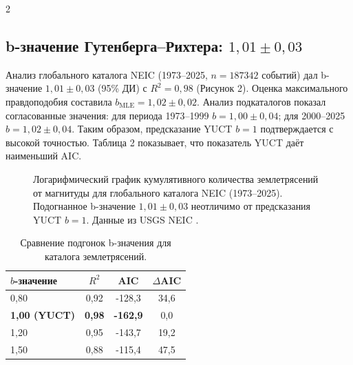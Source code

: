 \documentclass[11pt,a4paper]{article}
\begin{document}
\begin{multicols}{2}
		\subsection{b-значение Гутенберга–Рихтера: \(1,01 \pm 0,03\)}
		
		Анализ глобального каталога NEIC (1973–2025, \(n = 187 342\) событий) дал b-значение \(1,01 \pm 0,03\) (95\% ДИ) с \(R^2 = 0,98\) (Рисунок 2). Оценка максимального правдоподобия составила \(b_{\text{MLE}} = 1,02 \pm 0,02\). Анализ подкаталогов показал согласованные значения: для периода 1973–1999 \(b = 1,00 \pm 0,04\); для 2000–2025 \(b = 1,02 \pm 0,04\). Таким образом, предсказание YUCT \(b = 1\) подтверждается с высокой точностью. Таблица 2 показывает, что показатель YUCT даёт наименьший AIC.
		
		\begin{figure}[htbp]
			\centering
			\caption{Логарифмический график кумулятивного количества землетрясений от магнитуды для глобального каталога NEIC (1973–2025). Подогнанное b-значение \(1,01 \pm 0,03\) неотличимо от предсказания YUCT \(b = 1\). Данные из USGS NEIC \cite{USGSNEIC}.}
			\label{fig:earthquakes}
		\end{figure}
		
		\begin{table}[htbp]
			\centering
			\caption{Сравнение подгонок b-значения для каталога землетрясений.}
			\label{tab:earthquakes}
			\begin{tabular}{lccc}
				\toprule
				\textbf{$b$-значение} & $R^2$ & AIC & $\Delta$AIC \\
				\midrule
				0,80 & 0,92 & -128,3 & 34,6 \\
				\textbf{1,00 (YUCT)} & \textbf{0,98} & \textbf{-162,9} & 0,0 \\
				1,20 & 0,95 & -143,7 & 19,2 \\
				1,50 & 0,88 & -115,4 & 47,5 \\
				\bottomrule
			\end{tabular}
		\end{table}
		

\end{multicols}
\end{document}
